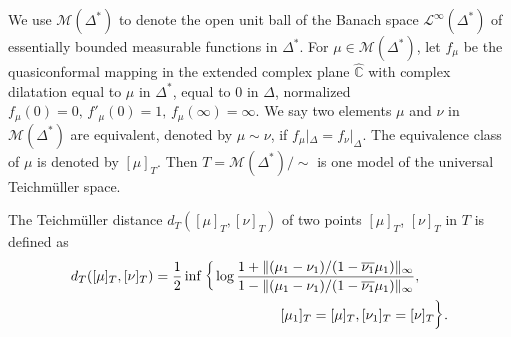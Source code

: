 \documentclass[11pt]{amsart}
\theoremstyle{remark}
\theoremstyle{claim}
\theoremstyle{definition}
\theoremstyle{problem}
\theoremstyle{conjecture}
\theoremstyle{question}
\numberwithin{equation}{section}
\begin{document}
We use $\mathcal{M}(\Delta^{*})$ to denote the open unit ball of the Banach space $\mathcal{L}^{\infty}({\Delta}^{*})$ of essentially bounded measurable functions in ${\Delta}^{*}$. For $\mu \in \mathcal{M}({\Delta}^{*})$, let $f_{\mu}$ be the quasiconformal mapping in the extended complex plane $\widehat{\mathbb{C}}$ with complex dilatation equal to $\mu$ in $\Delta^{*}$, equal to $0$ in $\Delta$, normalized $f_{\mu}(0)=0, \, f'_{\mu}(0)=1, \, f_{\mu}(\infty)=\infty$.  We say two elements $\mu$ and $\nu$ in $\mathcal{M}(\Delta^{*})$ are equivalent, denoted by $\mu\sim \nu$, if $f_{\mu}|_{\Delta}=f_{\nu}|_{\Delta}$. The equivalence class of $\mu$  is denoted by $[\mu]_{T}$. Then $T=\mathcal{M}(\Delta^{*})/\sim$ is one model of the universal Teichm\"uller space.

The Teichm\"uller distance $d_T([\mu]_{T}, [\nu]_{T})$ of two points $[\mu]_{T}$, $[\nu]_{T}$ in $T$ is defined as
\begin{eqnarray}
\lefteqn{d_T([\mu]_{T}, [\nu]_{T})=\frac{1}{2}\inf  \bigg\{ \log \frac{1+\|(\mu_1-\nu_1)/(1-\overline{\nu_1}\mu_1)\|_{\infty}}{1-\|(\mu_1-\nu_1)/(1-\overline{\nu_1}\mu_1)\|_{\infty}},}
\nonumber \\
&&\quad\quad\qquad\qquad\qquad\qquad\qquad\qquad [\mu_1]_{T}=[\mu]_{T}, [\nu_1]_{T}=[\nu]_{T}  \bigg\}. \nonumber
\end{eqnarray}
\end{document}
